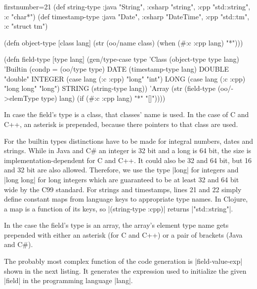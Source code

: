 \documentclass[submission]{eptcs}
\newcommand{\code}{\clojureinline}
\begin{document}
\begin{clojurecode*}{firstnumber=21}
(def string-type {:java "String", :csharp "string", :cpp "std::string", :c "char*"})
(def timestamp-type {:java "Date", :csharp "DateTime", :cpp "std::tm", :c "struct tm"})

(defn object-type [class lang]
  (str (oo/name class) (when (#{:c :cpp} lang) "*")))

(defn field-type [type lang]
  (gen/type-case type
    'Class   (object-type type lang)
    'Builtin (condp = (oo/type type)
               DATE    (timestamp-type lang)
               DOUBLE  "double"
               INTEGER (case lang (:c :cpp) "long"      "int")
               LONG    (case lang (:c :cpp) "long long" "long")
               STRING  (string-type lang))
    'Array   (str (field-type (oo/->elemType type) lang)
                  (if (#{:c :cpp} lang) "*" "[]"))))
\end{clojurecode*}

In case the field's type is a class, that classes' name is used.  In the case
of C and C++, an asterisk is prepended, because there pointers to that class
are used.

For the builtin types distinctions have to be made for integral numbers, dates
and strings.  While in Java and C\# an integer is 32 bit and a long is 64 bit,
the size is implementation-dependent for C and C++.  It could also be 32 and 64
bit, but 16 and 32 bit are also allowed.  Therefore, we use the type
\cinline|long| for integers and \cinline|long long| for long integers which are
guaranteed to be at least 32 and 64 bit wide by the C99 standard.  For strings
and timestamps, lines 21 and 22 simply define constant maps from language keys
to appropriate type names.  In Clojure, a map is a function of its keys, so
\code|(string-type :cpp)| returns \code|"std::string"|.

In the case the field's type is an array, the array's element type name gets
prepended with either an asterisk (for C and C++) or a pair of brackets (Java
and C\#).

The probably most complex function of the code generation is
\code|field-value-exp| shown in the next listing.  It generates the expression
used to initialize the given \code|field| in the programming language
\code|lang|.
\end{document}
